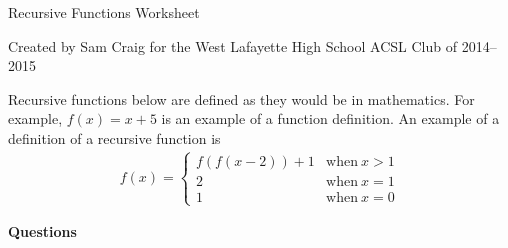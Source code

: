 \documentclass[12pt,letterpaper,fleqn]{article}
\begin{document}
\begin{center}
  Recursive Functions Worksheet

  Created by Sam Craig for the West Lafayette High School ACSL Club of 2014--2015
\end{center}

Recursive functions below are defined as they would be in mathematics.
For example, $f(x) = x + 5$ is an example of a function definition.
An example of a definition of a recursive function is
\begin{align*}
  f(x) =
  \begin{cases}
    f(f(x-2)) + 1 & \text{when}\ x > 1 \\
    2 & \text{when}\ x = 1 \\
    1 & \text{when}\ x = 0
  \end{cases}
\end{align*}

\noindent \textbf{Questions}
\end{document}
